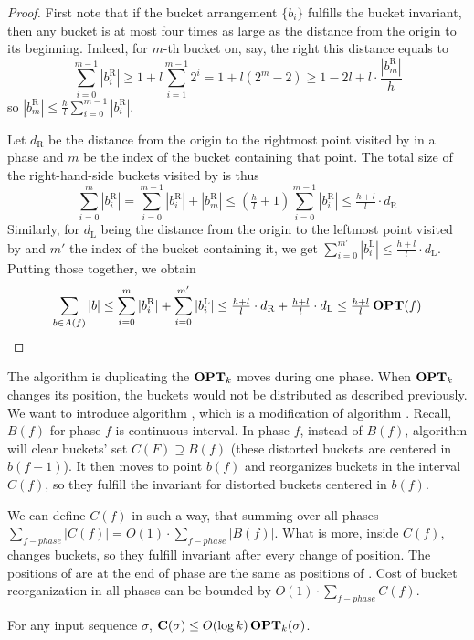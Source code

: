 \begin{proof}
First note that if the bucket arrangement $\{b_i\}$ fulfills the bucket
invariant, then any bucket is at most four times as large as the distance from
the origin to its beginning. Indeed, for $m$-th bucket on, say, the right this
distance equals to
\[ \sum_{i=0}^{m-1}|b_i^\text{R}| \geq 1 +  l\sum_{i=1}^{m-1}2^i = 1+l(2^m-2)
                                  \geq 1 - 2l + l\cdot\frac{|b_m^\text{R}|}h \]
so $|b_m^\text{R}|\leq\frac hl\sum_{i=0}^{m-1}|b_i^\text{R}|$.

Let $d_\text{R}$ be the distance from the origin to the rightmost point visited 
by \opt{} in a phase and $m$ be the index of the bucket containing that point. 
The total size of the right-hand-side buckets visited by \opt{} is thus
\[ \sum_{i=0}^m|b_i^\text{R}| = \sum_{i=0}^{m-1}|b_i^\text{R}|+|b_m^\text{R}|
                           \leq (\tfrac hl + 1)\sum_{i=0}^{m-1}|b_i^\text{R}|
                           \leq \tfrac{h+l}l\cdot d_\text{R} \]
Similarly, for $d_\text{L}$ being the distance from the origin to the leftmost 
point visited by \opt{} and $m'$ the index of the bucket containing it, we get 
$\sum_{i=0}^{m'}|b_i^\text{L}| \leq \tfrac{h+l}l\cdot d_\text{L}$. Putting those
together, we obtain
\[ \sum_{b\in A(f)}|b| \leq \sum_{i=0}^{m}|b_i^\text{R}|
                          + \sum_{i=0}^{m'}|b_i^\text{L}|
                       \leq \tfrac{h+l}l\cdot d_\text{R}
                          + \tfrac{h+l}l\cdot d_\text{L}
                       \leq \tfrac{h+l}l\operatorname{\mathbf{OPT}}(f) \qedhere \]
\end{proof}

The algorithm \fazowy{} is duplicating the $\operatorname{\mathbf{OPT}}_k$ moves during one phase. When
$\operatorname{\mathbf{OPT}}_k$ changes its position, the buckets would not be distributed as described
previously. We want to introduce algorithm \przesuw, which is a modification of
algorithm \fazowy. Recall, $B(f)$ for phase $f$ is continuous interval. In phase
$f$, instead of $B(f)$, algorithm \przesuw{} will clear buckets' set $C(F)
\supseteq B(f)$ (these distorted buckets are centered in $b(f-1)$). It then
moves to point $b(f)$ and reorganizes buckets in the interval $C(f)$, so they
fulfill the invariant for distorted buckets centered in $b(f)$. 

\begin{lemma}
We can define $C(f)$ in such a way, that summing over all phases $\sum_{f - 
phase} |C(f)| = O(1) \cdot \sum_{f - phase} |B(f)|$. What is more, inside 
$C(f)$, \przesuw{} changes buckets, so they fulfill invariant after 
every change of \przesuw{} position. The positions of \przesuw{} are at the end 
of phase are the same as positions of \fazowy. Cost of bucket reorganization 
in all phases can be bounded by $O(1) \cdot \sum_{f-phase} C(f)$.
\end{lemma}

\begin{theorem}
For any input sequence $\sigma$, $\operatorname{\mathbf{C}}(\sigma)\leq O(\log k)\operatorname{\mathbf{OPT}}_k(\sigma)$.
\end{theorem}
